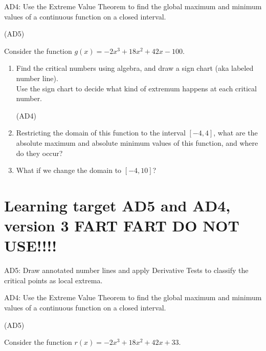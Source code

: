 AD4: Use the Extreme Value Theorem to find the global maximum and minimum values of a continuous function on a closed interval.

\hrulefill (AD5)

Consider the function
\(g(x) =-2x^{3}+18x^{2}+42x-100\).
	
	\begin{enumerate}[leftmargin=15pt]

		\item Find the critical numbers using algebra, and draw a sign chart (aka labeled number line). \\
		Use the sign chart to decide what kind of extremum happens at each critical number.

		\vfill
		\vfill
	
		\hrulefill (AD4)
		\item Restricting the domain of this function to the interval $[-4, 4]$, what are the absolute maximum and absolute minimum values of this function, and where do they occur?

		\vfill
	
		
		\item What if we change the domain to $[-4,10]$?
		
		\vfill
	
	\end{enumerate}
\pagebreak
\section{Learning target AD5 and AD4, version 3 FART FART DO NOT USE!!!!}

AD5: Draw annotated number lines and apply Derivative Tests to classify the critical points as local extrema.

AD4: Use the Extreme Value Theorem to find the global maximum and minimum values of a continuous function on a closed interval.

\hrulefill (AD5)

Consider the function
\(r(x) =-2x^{3}+18x^{2}+42x+33\).
	
